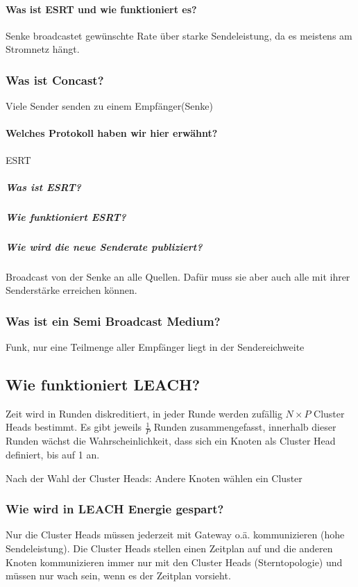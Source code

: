 		\paragraph{Was ist ESRT und wie funktioniert es?}
		Senke broadcastet gewünschte Rate über starke Sendeleistung, da es meistens am Stromnetz hängt.
			
		
		\subsubsection{Was ist Concast?}
		Viele Sender senden zu einem Empfänger(Senke)
		\paragraph{Welches Protokoll haben wir hier erwähnt?}
			ESRT 
			\subparagraph{Was ist ESRT?}
			
			\subparagraph{Wie funktioniert ESRT?}
			
			\subparagraph{Wie wird die neue Senderate publiziert?}
			Broadcast von der Senke an alle Quellen. Dafür muss sie aber auch alle mit ihrer Senderstärke erreichen können.
			
		\subsubsection{Was ist ein Semi\- Broadcast Medium?}
		Funk, nur eine Teilmenge aller Empfänger liegt in der Sendereichweite
		
	\subsection{Wie funktioniert LEACH?}
	Zeit wird in Runden diskreditiert, in jeder Runde werden zufällig $N \times P$ Cluster\- Heads bestimmt.
	Es gibt jeweils $\frac{1}{P}$ Runden zusammengefasst, innerhalb dieser Runden wächst die Wahrscheinlichkeit, dass sich ein Knoten als Cluster\- Head definiert, bis auf 1 an. 
	
	Nach der Wahl der Cluster\- Heads: Andere Knoten wählen ein Cluster
	
	
	\subsubsection{Wie wird in LEACH Energie gespart?}
	Nur die Cluster\- Heads müssen jederzeit mit Gateway o.ä. kommunizieren (hohe Sendeleistung).
	Die Cluster\- Heads stellen einen Zeitplan auf und die anderen Knoten kommunizieren immer nur mit den Cluster\- Heads (Sterntopologie) und müssen nur wach sein, wenn es der Zeitplan vorsieht.
	
